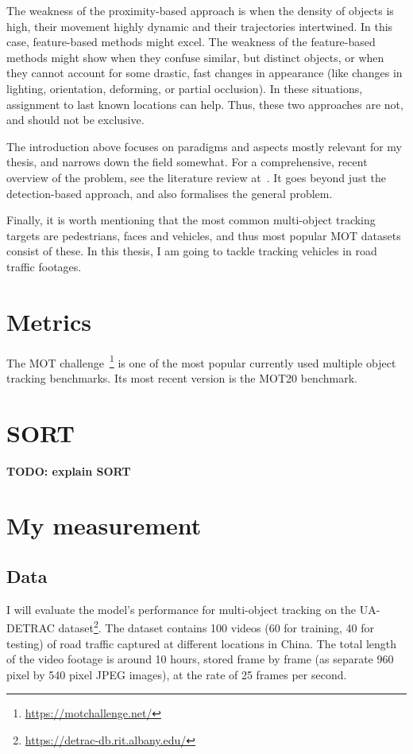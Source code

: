 The weakness of the proximity-based approach is when the density of objects is high, their movement highly dynamic and their trajectories intertwined. In this case, feature-based methods might excel. The weakness of the feature-based methods might show when they confuse similar, but distinct objects, or when they cannot account for some drastic, fast changes in appearance (like changes in lighting, orientation, deforming, or partial occlusion). In these situations, assignment to last known locations can help. Thus, these two approaches are not, and should not be exclusive.

The introduction above focuses on paradigms and aspects mostly relevant for my thesis, and narrows down the field somewhat. For a comprehensive, recent overview of the problem, see the literature review at~\cite{Luo_2021}. It goes beyond just the detection-based approach, and also formalises the general problem.

Finally, it is worth mentioning that the most common multi-object tracking targets are pedestrians, faces and vehicles, and thus most popular MOT datasets consist of these. In this thesis, I am going to tackle tracking vehicles in road traffic footages.

\section{Metrics}

The MOT challenge~\footnote{\url{https://motchallenge.net/}} is one of the most popular currently used multiple object tracking benchmarks. Its most recent version is the MOT20 benchmark.

\section{SORT}

\textbf{TODO: explain SORT}

\section{My measurement}
\subsection{Data}

I will evaluate the model's performance for multi-object tracking on the UA-DETRAC dataset\footnote{\url{https://detrac-db.rit.albany.edu/}}. The dataset contains 100 videos (60 for training, 40 for testing) of road traffic captured at different locations in China. The total length of the video footage is around 10 hours, stored frame by frame (as separate 960 pixel by 540 pixel JPEG images), at the rate of 25 frames per second.


